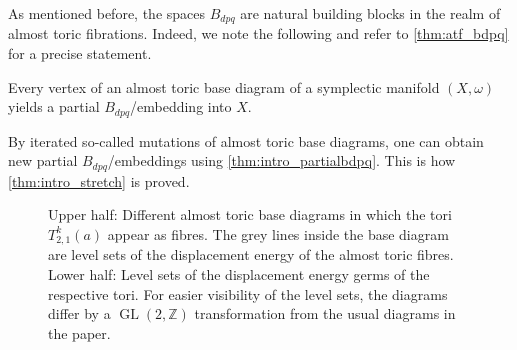 \documentclass[12pt,a4paper,abstract=true,final]{scrartcl}
\DeclareMathOperator{\GL}{GL}
\begin{document}
As mentioned before, the spaces $B_{dpq}$ are natural building blocks in the realm of almost toric fibrations.
Indeed, we note the following and refer to \cref{thm:atf_bdpq} for a precise statement.

\begin{proposition}
    \label{thm:intro_partialbdpq}
    Every vertex of an almost toric base diagram of a symplectic manifold $(X,\omega)$ yields a partial $B_{dpq}$\-/embedding into $X$. 
\end{proposition}

By iterated so-called mutations of almost toric base diagrams, one can obtain new partial $B_{dpq}$\-/embeddings using \cref{thm:intro_partialbdpq}.
This is how \cref{thm:intro_stretch} is proved.

\begin{figure}
    \centering
    \caption{Upper half: Different almost toric base diagrams in which the tori $T^k_{2,1}(a)$ appear as fibres. The grey lines inside the base diagram are level sets of the displacement energy of the almost toric fibres. Lower half: Level sets of the displacement energy germs of the respective tori. 
    For easier visibility of the  level sets, the diagrams differ by a $\GL(2,ℤ)$ transformation from the usual diagrams in the paper.}
    \label{fig:germ_examples}
\end{figure}
\end{document}
